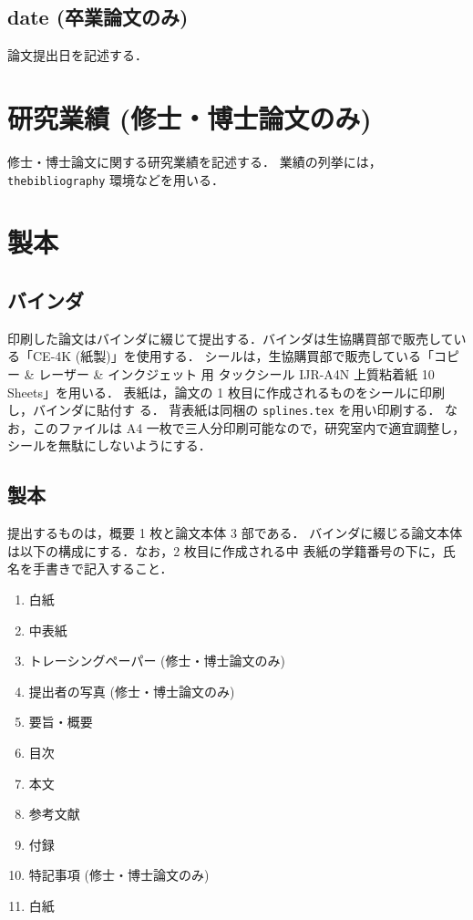 \documentclass[11pt,titlepage,uplatex]{ujreport}
\begin{document}
\subsection{date (卒業論文のみ)}
論文提出日を記述する．

\section{研究業績 (修士・博士論文のみ)}

修士・博士論文に関する研究業績を記述する．
業績の列挙には，{\tt thebibliography} 環境などを用いる．

\section{製本}

\subsection{バインダ}
印刷した論文はバインダに綴じて提出する．バインダは生協購買部で販売してい
る「CE-4K (紙製)」を使用する．
シールは，生協購買部で販売している「コピー \& レーザー \& インクジェット
用 タックシール IJR-A4N 上質粘着紙 10 Sheets」を用いる．
表紙は，論文の 1 枚目に作成されるものをシールに印刷し，バインダに貼付す
る．
背表紙は同梱の {{\tt splines.tex}} を用い印刷する．
なお，このファイルは A4 一枚で三人分印刷可能なので，研究室内で適宜調整し，
シールを無駄にしないようにする．

\subsection{製本}
提出するものは，概要 1 枚と論文本体 3 部である．
バインダに綴じる論文本体は以下の構成にする．なお，2 枚目に作成される中
表紙の学籍番号の下に，氏名を手書きで記入すること．
\begin{enumerate}
  \item 白紙
  \item 中表紙
  \item トレーシングペーパー (修士・博士論文のみ)
  \item 提出者の写真 (修士・博士論文のみ)
  \item 要旨・概要
  \item 目次
  \item 本文
  \item 参考文献
  \item 付録
  \item 特記事項 (修士・博士論文のみ)
  \item 白紙
\end{enumerate}
\end{document}
